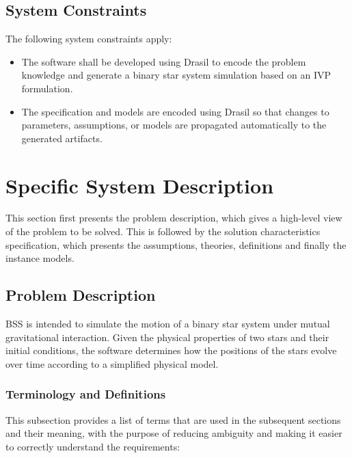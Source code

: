 \documentclass[12pt]{article}
\begin{document}
\subsection{System Constraints}

The following system constraints apply:
\begin{itemize}
\item The software shall be developed using Drasil to encode the problem
  knowledge and generate a binary star system simulation based on an IVP
  formulation.
\item The specification and models are encoded using Drasil so that changes to
  parameters, assumptions, or models are propagated automatically to the
  generated artifacts.
\end{itemize}
\newpage
\section{Specific System Description} \label{sec_SpecificSystemDescription}

This section first presents the problem description, which gives a high-level
view of the problem to be solved.  This is followed by the solution
characteristics specification, which presents the assumptions, theories,
definitions and finally the instance models.

\subsection{Problem Description} \label{Sec_pd}

BSS is intended to simulate the motion of a binary star system under mutual
gravitational interaction. Given the physical properties of two stars and their
initial conditions, the software determines how the positions of the stars
evolve over time according to a simplified physical model.

\subsubsection{Terminology and  Definitions}

This subsection provides a list of terms that are used in the subsequent
sections and their meaning, with the purpose of reducing ambiguity and making it
easier to correctly understand the requirements:
\end{document}
